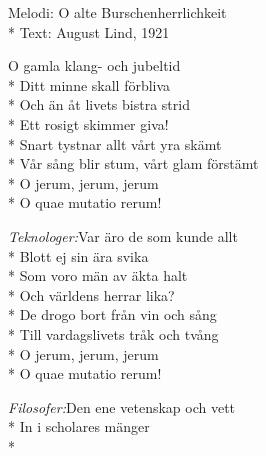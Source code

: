 \begin{SongText}
    \begin{SongInfo}
        Melodi: O alte Burschenherrlichkeit\\*
        Text: August Lind, 1921
    \end{SongInfo}
    \begin{SongVerse}
        O gamla klang- och jubeltid\\*
        Ditt minne skall förbliva\\*
        Och än åt livets bistra strid\\*
        Ett rosigt skimmer giva!\\*
        Snart tystnar allt vårt yra skämt\\*
        Vår sång blir stum, vårt glam förstämt\\*
        O jerum, jerum, jerum\\*
        O quae mutatio rerum!
    \end{SongVerse}
    \begin{SongVerse}%
        \textit{Teknologer:}\hspace{6mm}Var äro de som kunde allt\\*
        \hspace{21mm}Blott ej sin ära svika\\*
        \hspace{21mm}Som voro män av äkta halt\\*
        \hspace{21mm}Och världens herrar lika?\\*
        \hspace{21mm}De drogo bort från vin och sång\\*
        \hspace{21mm}Till vardagslivets tråk och tvång\\*
        \hspace{21mm}O jerum, jerum, jerum\\*
        \hspace{21mm}O quae mutatio rerum!
    \end{SongVerse}
    \begin{SongVerse}
        \textit{Filosofer:}\hspace{9,1mm}Den ene vetenskap och vett\\*
        \hspace{21mm}In i scholares mänger\\*

\end{SongVerse}
\end{SongText}
